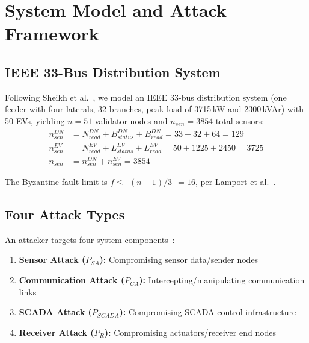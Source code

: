 \documentclass[10pt,twocolumn,letterpaper]{article}
\begin{document}
\section{System Model and Attack Framework}
\label{sec:system}

\subsection{IEEE 33-Bus Distribution System}

Following Sheikh et al.~\cite{sheikh2020}, we model an IEEE 33-bus distribution system (one feeder with four laterals, 32 branches, peak load of 3715\,kW and 2300\,kVAr) with 50 EVs, yielding $n = 51$ validator nodes and $n_{sen} = 3854$ total sensors:
\begin{align}
n_{sen}^{DN} &= N_{read}^{DN} + B_{status}^{DN} + B_{read}^{DN} = 33 + 32 + 64 = 129 \label{eq:nsen_dn} \\
n_{sen}^{EV} &= N_{read}^{EV} + L_{status}^{EV} + L_{read}^{EV} = 50 + 1225 + 2450 = 3725 \label{eq:nsen_ev} \\
n_{sen} &= n_{sen}^{DN} + n_{sen}^{EV} = 3854 \label{eq:nsen_total}
\end{align}

The Byzantine fault limit is $f \leq \lfloor(n-1)/3\rfloor = 16$, per Lamport et al.~\cite{lamport1982}.

\subsection{Four Attack Types}

An attacker targets four system components~\cite{sheikh2020}:
\begin{enumerate}[leftmargin=*]
    \item \textbf{Sensor Attack ($P_{SA}$):} Compromising sensor data/sender nodes
    \item \textbf{Communication Attack ($P_{CA}$):} Intercepting/manipulating communication links
    \item \textbf{SCADA Attack ($P_{SCADA}$):} Compromising SCADA control infrastructure
    \item \textbf{Receiver Attack ($P_R$):} Compromising actuators/receiver end nodes
\end{enumerate}

\end{document}
